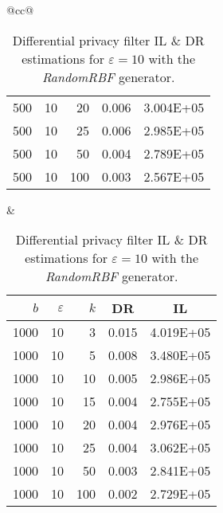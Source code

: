 \begin{table}[H]
\begin{tabular}{@{}cc@{}}
\begin{tabular}{@{}rrrrr@{}}
			500 & 10 & 20  & 0.006 & 3.004E+05 \\
			500 & 10 & 25  & 0.006 & 2.985E+05 \\
			500 & 10 & 50  & 0.004 & 2.789E+05 \\
			500 & 10 & 100 & 0.003 & 2.567E+05 \\ \bottomrule
		\end{tabular}
		&
		\begin{tabular}{@{}rrrrr@{}}
			\toprule
			$b$ & $\varepsilon$ & $k$ & \multicolumn{1}{c}{DR} & \multicolumn{1}{c}{IL} \\ \midrule
			1000 & 10 & 3   & 0.015 & 4.019E+05 \\
			1000 & 10 & 5   & 0.008 & 3.480E+05 \\
			1000 & 10 & 10  & 0.005 & 2.986E+05 \\
			1000 & 10 & 15  & 0.004 & 2.755E+05 \\
			1000 & 10 & 20  & 0.004 & 2.976E+05 \\
			1000 & 10 & 25  & 0.004 & 3.062E+05 \\
			1000 & 10 & 50  & 0.003 & 2.841E+05 \\
			1000 & 10 & 100 & 0.002 & 2.729E+05 \\ \bottomrule
		\end{tabular}
	\end{tabular}
	\caption[Differential privacy filter DR \& IL estimations (RandomRBF), $\varepsilon = 10$.]{Differential privacy filter IL \& DR estimations for $\varepsilon = 10$ with the \textit{RandomRBF} generator.}
\end{table}

